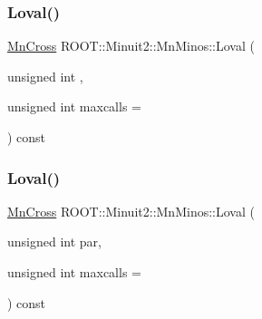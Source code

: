 \mbox{\label{classROOT_1_1Minuit2_1_1MnMinos_a708381f90e4bd9118dec60726a1bdf73}} 
\subsubsection{\texorpdfstring{Loval()}{Loval()}\hspace{0.1cm}{\footnotesize\ttfamily [2/3]}}
{\footnotesize\ttfamily \mbox{\hyperlink{classROOT_1_1Minuit2_1_1MnCross}{Mn\+Cross}} R\+O\+O\+T\+::\+Minuit2\+::\+Mn\+Minos\+::\+Loval (\begin{DoxyParamCaption}\item[{unsigned int}]{,  }\item[{unsigned int}]{maxcalls = {} }\end{DoxyParamCaption}) const}

\mbox{\label{classROOT_1_1Minuit2_1_1MnMinos_a708381f90e4bd9118dec60726a1bdf73}} 
\subsubsection{\texorpdfstring{Loval()}{Loval()}\hspace{0.1cm}{\footnotesize\ttfamily [3/3]}}
{\footnotesize\ttfamily \mbox{\hyperlink{classROOT_1_1Minuit2_1_1MnCross}{Mn\+Cross}} R\+O\+O\+T\+::\+Minuit2\+::\+Mn\+Minos\+::\+Loval (\begin{DoxyParamCaption}\item[{unsigned int}]{par,  }\item[{unsigned int}]{maxcalls = {} }\end{DoxyParamCaption}) const}

